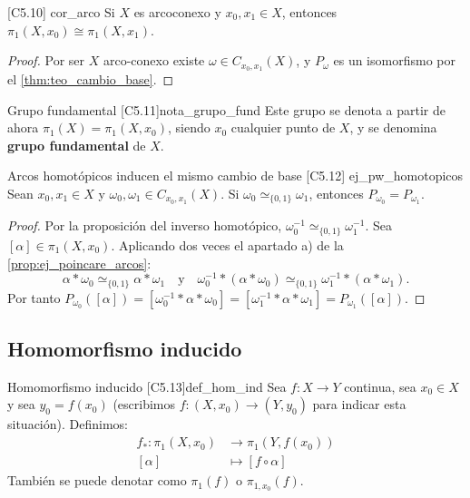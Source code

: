\begin{proposicion}{ [C5.10] \marcaC}{cor_arco}
Si $X$ es arcoconexo y $x_0, x_1 \in X$, entonces $\pi_1(X, x_0) \cong \pi_1(X, x_1)$.
\end{proposicion}

\begin{proof}
Por ser $X$ arco-conexo existe $\omega \in C_{x_0,x_1}(X)$, y $P_\omega$ es un isomorfismo por el \cref{thm:teo_cambio_base}.
\end{proof}

\begin{nota}{Grupo fundamental [C5.11]}{nota_grupo_fund}
Este grupo se denota a partir de ahora $\pi_1(X) = \pi_1(X, x_0)$, siendo $x_0$ cualquier punto de $X$, y se denomina \textbf{grupo fundamental} de $X$.
\end{nota}

\begin{proposicion}{Arcos homotópicos inducen el mismo cambio de base [C5.12] \marcaE}{ej_pw_homotopicos}
Sean $x_0, x_1 \in X$ y $\omega_0, \omega_1 \in C_{x_0, x_1}(X)$. Si $\omega_0 \simeq_{\{0,1\}} \omega_1$, entonces $P_{\omega_0} = P_{\omega_1}$.
\end{proposicion}

\begin{proof}
Por la proposición del inverso homotópico, $\omega_0^{-1} \simeq_{\{0,1\}} \omega_1^{-1}$. Sea $[\alpha] \in \pi_1(X,x_0)$. Aplicando dos veces el apartado a) de la \cref{prop:ej_poincare_arcos}:
\[ \alpha * \omega_0 \simeq_{\{0,1\}} \alpha * \omega_1 \quad\text{y}\quad \omega_0^{-1} * (\alpha * \omega_0) \simeq_{\{0,1\}} \omega_1^{-1} * (\alpha * \omega_1). \]
Por tanto $P_{\omega_0}([\alpha]) = [\omega_0^{-1} * \alpha * \omega_0] = [\omega_1^{-1} * \alpha * \omega_1] = P_{\omega_1}([\alpha])$.
\end{proof}

\subsection{Homomorfismo inducido}

\begin{definicion}{Homomorfismo inducido [C5.13]}{def_hom_ind}
Sea $f: X \to Y$ continua, sea $x_0 \in X$ y sea $y_0 = f(x_0)$ (escribimos $f \colon (X,x_0) \to (Y,y_0)$ para indicar esta situación). Definimos:
\begin{align*}
f_* : \pi_1(X, x_0) &\to \pi_1(Y, f(x_0)) \\
[\alpha] &\mapsto [f \circ \alpha]
\end{align*}
También se puede denotar como $\pi_1(f)$ o $\pi_{1,x_0}(f)$.
\end{definicion}

